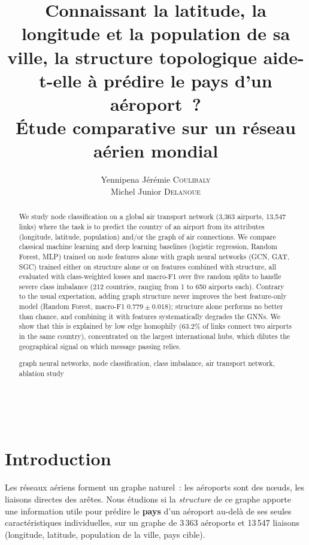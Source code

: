 \documentclass[french]{llncs}
\title{Connaissant la latitude, la longitude et la population de sa ville, la structure topologique aide-t-elle à prédire le pays d'un aéroport~? \\
       Étude comparative sur un réseau aérien mondial}
\author{ Yennipena Jérémie \textsc{Coulibaly} \\
         Michel Junior \textsc{Delanoue} }
\institute{Université Claude Bernard Lyon 1, France \\
\url{https://github.com/cyjere/rendu-tp-gnn-Coulibaly-and-Delanoue}}
\begin{document}
    \renewcommand{\abstractname}{Abstract} \\
    \renewcommand{\thelstlisting}{\arabic{lstlisting}}

    \maketitle

    \begin{abstract}
        We study node classification on a global air transport network (3,363 airports,
        13,547 links) where the task is to predict the country of an airport from its
        attributes (longitude, latitude, population) and/or the graph of air connections.
        We compare classical machine learning and deep learning baselines
        (logistic regression, Random Forest, MLP) trained on node features alone with
        graph neural networks (GCN, GAT, SGC) trained either on structure alone or on
        features combined with structure, all evaluated with class-weighted losses and
        macro-F1 over five random splits to handle severe class imbalance (212 countries,
        ranging from 1 to 650 airports each). Contrary to the usual expectation, adding
        graph structure never improves the best feature-only model (Random Forest,
        macro-F1 $0.779 \pm 0.018$); structure alone performs no better than chance, and
        combining it with features systematically degrades the GNNs. We show that this is
        explained by low edge homophily (63.2\% of links connect two airports in the same
        country), concentrated on the largest international hubs, which dilutes the
        geographical signal on which message passing relies.

        \begin{keywords}
            graph neural networks, node classification, class imbalance,
            air transport network, ablation study
        \end{keywords}
    \end{abstract}


    \section{Introduction} \label{intro}

    Les réseaux aériens forment un graphe naturel~: les aéroports sont des nœuds, les liaisons
    directes des arêtes. Nous étudions si la \emph{structure} de ce graphe apporte une information
    utile pour prédire le \textbf{pays} d'un aéroport au-delà de ses seules caractéristiques
    individuelles, sur un graphe de 3\,363 aéroports et 13\,547 liaisons (longitude, latitude,
    population de la ville, pays cible).
\end{document}
